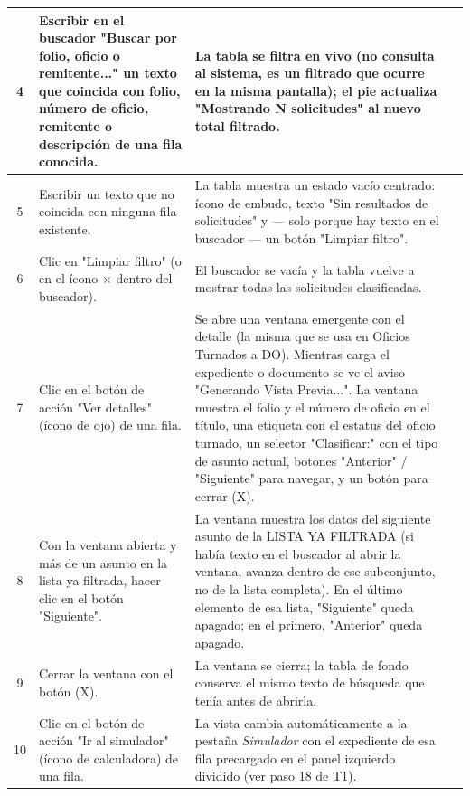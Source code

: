 \documentclass[11pt]{article}
\newcommand{\chk}[1]{\CheckBox[name=#1,width=11pt,height=11pt,bordercolor=grisborde,backgroundcolor=1 1 1]{}}
\begin{document}
\begin{Form}
\begin{longtable}{|c|p{6.7cm}|p{6.7cm}|c|}
4 &
Escribir en el buscador "Buscar por folio, oficio o remitente..." un texto que coincida con folio,
número de oficio, remitente o descripción de una fila conocida. &
La tabla se filtra en vivo (no consulta al sistema, es un filtrado que ocurre en la misma pantalla); el pie actualiza
"Mostrando N solicitudes" al nuevo total filtrado. &
\chk{t3r4} \\ \hline

5 &
Escribir un texto que no coincida con ninguna fila existente. &
La tabla muestra un estado vacío centrado: ícono de embudo, texto "Sin resultados de solicitudes" y
--- solo porque hay texto en el buscador --- un botón "Limpiar filtro". &
\chk{t3r5} \\ \hline

6 &
Clic en "Limpiar filtro" (o en el ícono $\times$ dentro del buscador). &
El buscador se vacía y la tabla vuelve a mostrar todas las solicitudes clasificadas. &
\chk{t3r6} \\ \hline

7 &
Clic en el botón de acción "Ver detalles" (ícono de ojo) de una fila. &
Se abre una ventana emergente con el detalle (la misma que se usa en Oficios Turnados a DO).
Mientras carga el expediente o documento se ve el aviso "Generando Vista Previa...". La ventana
muestra el folio y el número de oficio en el título, una etiqueta con el estatus del oficio
turnado, un selector "Clasificar:" con el tipo de asunto actual, botones "Anterior" / "Siguiente"
para navegar, y un botón para cerrar (X). &
\chk{t3r7} \\ \hline

8 &
Con la ventana abierta y más de un asunto en la lista ya filtrada, hacer clic en el botón
"Siguiente". &
La ventana muestra los datos del siguiente asunto de la LISTA YA FILTRADA (si había texto en el
buscador al abrir la ventana, avanza dentro de ese subconjunto, no de la lista completa). En el
último elemento de esa lista, "Siguiente" queda apagado; en el primero, "Anterior" queda apagado. &
\chk{t3r8} \\ \hline

9 &
Cerrar la ventana con el botón (X). &
La ventana se cierra; la tabla de fondo conserva el mismo texto de búsqueda que tenía antes de
abrirla. &
\chk{t3r9} \\ \hline

10 &
Clic en el botón de acción "Ir al simulador" (ícono de calculadora) de una fila. &
La vista cambia automáticamente a la pestaña \emph{Simulador} con el expediente de esa fila
precargado en el panel izquierdo dividido (ver paso 18 de T1). &
\chk{t3r10} \\ \hline


\end{longtable}
\end{Form}
\end{document}
